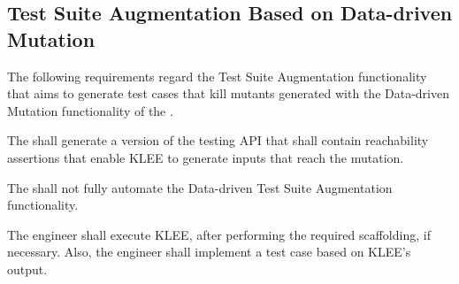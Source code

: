 \subsection{Test Suite Augmentation Based on Data-driven Mutation}
\label{sec:codeDrivenAugmentation}

The following requirements regard the Test Suite Augmentation functionality that aims to generate test cases that kill mutants generated with the Data-driven Mutation functionality of the \FAQAS.

\RQ{} The \FAQAS shall generate a version of the testing API that shall contain reachability assertions that enable KLEE to generate inputs that reach the mutation.

\RQ{} The \FAQAS shall not fully automate the Data-driven Test Suite Augmentation functionality.

\remark The engineer shall execute KLEE, after performing the required scaffolding, if necessary.
Also, the engineer shall implement a test case based on KLEE's output.
